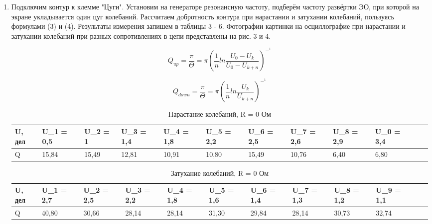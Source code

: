 \documentclass[a4paper]{article}
\begin{document}
\begin{enumerate}
    \item Подключим контур к клемме "Цуги". Установим на генераторе резонансную частоту, подберём частоту развёртки ЭО, при которой на экране укладывается один цуг колебаний. Рассчитаем добротность контура при нарастании и затухании колебаний, пользуясь формулами (3) и (4). Результаты измерения запишем в таблицы 3 - 6. Фотографии картинки на осциллографие при нарастании и затухании колебаний при разных сопротивлениях в цепи представлены на рис. 3 и 4.
    
    $$ Q_{up} = \frac{\pi}{\Theta} =  \pi (\frac{1}{n} ln \frac{U_0 - U_k}{U_0 - U_{k+n}})^-^1 $$

$$ Q_{down} = \frac{\pi}{\Theta} = \pi (\frac{1}{n} ln \frac{U_k}{U_{k+n}})^-^1 $$
    
        \begin{table}[h]
    \centering
    \begin{center}
    \caption{Нарастание колебаний, R = 0 Ом}
    \end{center}
    \vspace{0.1cm}
    \label{tab:my_label}
    \begin{tabular}{ |p{1.5cm}|p{1.5cm}|p{1.5cm}|p{1.5cm}|p{1.5cm}|p{1.5cm}|p{1.5cm}|p{1.5cm}|p{1.5cm}|p{1.5cm}|p{1.5cm}|p{1.5cm}| }
 \hline
    U, дел & U_1 = 0,5 & U_2 = 1 & U_3 = 1,4 & U_4 = 1,8 & U_5 = 2,2 & U_6 = 2,5 & U_7 = 2,6 & U_8 = 2,9 & U_0 = 3,4 \\
\hline 
    Q &	15,84 & 15,49 &	12,81 &	10,91 &	10,80 &	15,49 &	10,76 &	6,40 &	6,80\\
 \hline
\end{tabular}
\end{table}

    \begin{table}[h]
    \centering
    \begin{center}
    \caption{Затухание колебаний, R = 0 Ом}
    \end{center}
    \vspace{0.1cm}
    \label{tab:my_label}
    \begin{tabular}{ |p{1.5cm}|p{1.5cm}|p{1.5cm}|p{1.5cm}|p{1.5cm}|p{1.5cm}|p{1.5cm}|p{1.5cm}|p{1.5cm}|p{1.5cm}|p{1.5cm}|p{1.5cm}| }
 \hline
    U, дел & U_1 = 2,7 & U_2 = 2,5 & U_3 = 2,2 & U_4 = 1,8 & U_5 = 1,6 & U_6 = 1,4 & U_7 = 1,3 & U_8 = 1,2 & U_9 = 1,1 \\
\hline 
    Q &	40,80 &	30,66 &	28,14 &	28,14 &	31,30 &	29,84 &	28,14 &	30,73 &	32,74\\
 \hline
\end{tabular}
\end{table}
    

\end{enumerate}
\end{document}

